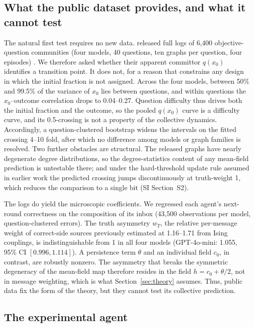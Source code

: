 \documentclass[11pt]{article}
\begin{document}
\subsection{What the public dataset provides, and what it cannot test}

The natural first test requires no new data. \citet{El2026} released full
logs of 6{,}400 objective-question communities (four models, 40 questions,
ten graphs per question, four episodes) \citep{El2026data}. We therefore
asked whether their apparent committor $q(x_0)$ identifies a transition
point. It does not, for a reason that constrains any design in which the
initial fraction is not assigned. Across the four models, between 50\% and
99.5\% of the variance of $x_0$ lies between questions, and within
questions the $x_0$--outcome correlation drops to 0.04--0.27. Question
difficulty thus drives both the initial fraction and the outcome, so the
pooled $q(x_0)$ curve is a difficulty curve, and its 0.5-crossing is not a
property of the collective dynamics. Accordingly, a question-clustered
bootstrap widens the intervals on the fitted crossing 4--10 fold, after
which no difference among models or graph families is resolved. Two
further obstacles are structural. The released graphs have nearly
degenerate degree distributions, so the degree-statistics content of any
mean-field prediction is untestable there; and under the hard-threshold
update rule assumed in earlier work the predicted crossing jumps
discontinuously at truth-weight 1, which reduces the comparison to a single
bit (SI Section~S2).

The logs do yield the microscopic coefficients. We regressed each agent's
next-round correctness on the composition of its inbox (43{,}500
observations per model, question-clustered errors). The truth asymmetry
$w_T$, the relative per-message weight of correct-side sources previously
estimated at 1.16--1.71 from Ising couplings, is indistinguishable from 1
in all four models (GPT-4o-mini: 1.055, 95\% CI $[0.996, 1.114]$). A
persistence term $\theta$ and an individual field $c_0$, in contrast, are
robustly nonzero. The asymmetry that breaks the symmetric degeneracy of the
mean-field map therefore resides in the field $h = c_0 + \theta/2$, not in
message weighting, which is what Section~\ref{sec:theory} assumes. Thus,
public data fix the form of the theory, but they cannot test its
collective prediction.

\subsection{The experimental agent}
\end{document}
